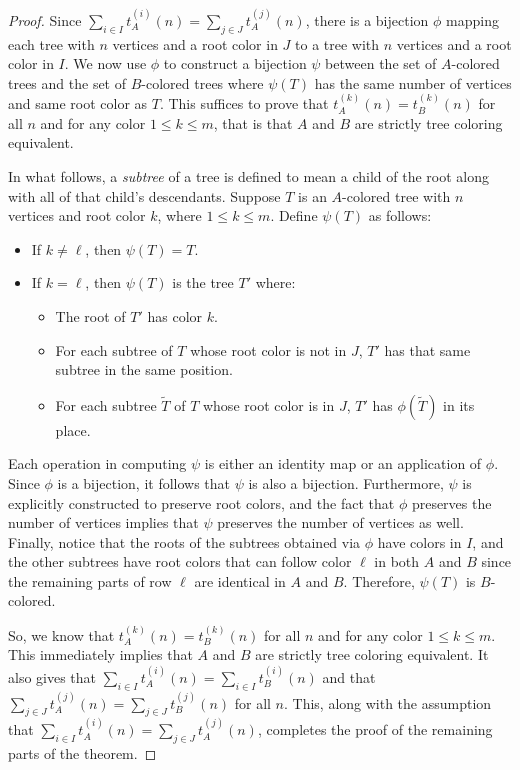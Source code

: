 \documentclass[12pt]{amsart}
\begin{document}
\begin{proof}
Since $\sum_{i\in I}t_A^{(i)}(n)=\sum_{j\in J}t_A^{(j)}(n)$, there is a bijection $\phi$ mapping each tree with $n$ vertices and a root color in $J$ to a tree with $n$ vertices and a root color in $I$. We now use $\phi$ to construct a bijection $\psi$ between the set of $A$-colored trees and the set of $B$-colored trees where $\psi(T)$ has the same number of vertices and same root color as $T$. This suffices to prove that $t^{(k)}_A(n)=t^{(k)}_{B}(n)$ for all $n$ and for any color $1\leq k\leq m$, that is that $A$ and $B$ are strictly tree coloring equivalent.

In what follows, a \emph{subtree} of a tree is defined to mean a child of the root along with all of that child's descendants. Suppose $T$ is an $A$-colored tree with $n$ vertices and root color $k$, where $1\leq k\leq m$.  Define $\psi(T)$ as follows:
\begin{itemize}
    \item If $k\neq\ell$, then $\psi(T)=T$.
    \item If $k=\ell$, then $\psi(T)$ is the tree $T'$ where:
    \begin{itemize}
        \item The root of $T'$ has color $k$.
        \item For each subtree of $T$ whose root color is not in $J$, $T'$ has that same subtree in the same position.
        \item For each subtree $\tilde T$ of $T$ whose root color is in $J$, $T'$ has $\phi(\tilde T)$ in its place.
    \end{itemize}
\end{itemize}
Each operation in computing $\psi$ is either an identity map or an application of $\phi$. Since $\phi$ is a bijection, it follows that $\psi$ is also a bijection. Furthermore, $\psi$ is explicitly constructed to preserve root colors, and the fact that $\phi$ preserves the number of vertices implies that $\psi$ preserves the number of vertices as well. Finally, notice that the roots of the subtrees obtained via $\phi$ have colors in $I$, and the other subtrees have root colors that can follow color $\ell$ in both $A$ and $B$ since the remaining parts of row $\ell$ are identical in $A$ and $B$. Therefore, $\psi(T)$ is $B$-colored.

So, we know that $t^{(k)}_A(n)=t^{(k)}_{B}(n)$ for all $n$ and for any color $1\leq k\leq m$. This immediately implies that $A$ and $B$ are strictly tree coloring equivalent. It also gives that $\sum_{i\in I}t^{(i)}_A(n)=\sum_{i\in I}t^{(i)}_{B}(n)$ and that $\sum_{j\in J}t^{(j)}_A(n)=\sum_{j\in J}t^{(j)}_{B}(n)$ for all $n$. This, along with the assumption that $\sum_{i\in I}t^{(i)}_A(n)=\sum_{j\in J}t^{(j)}_{A}(n)$, completes the proof of the remaining parts of the theorem.
\end{proof}
\end{document}
